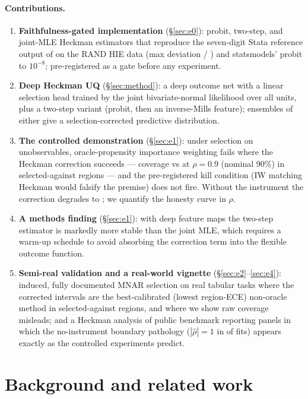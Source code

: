 \documentclass[10pt]{article}
\begin{document}
\paragraph{Contributions.}
\begin{enumerate}
\item \textbf{Faithfulness-gated implementation} (\S\ref{sec:e0}): probit,
two-step, and joint-MLE Heckman estimators that reproduce the seven-digit
Stata reference output of \citet{cameron2005} on the RAND HIE data
(max deviation \EZeroDevTS{} / \EZeroDevMLE{}) and statsmodels' probit to
$10^{-8}$; pre-registered as a gate before any experiment.
\item \textbf{Deep Heckman UQ} (\S\ref{sec:method}): a deep outcome net
with a linear selection head trained by the joint bivariate-normal
likelihood over all units, plus a two-step variant (probit, then an
inverse-Mills feature); ensembles of either give a selection-corrected
predictive distribution.
\item \textbf{The controlled demonstration} (\S\ref{sec:e1}): under
selection on unobservables, oracle-propensity importance weighting fails
where the Heckman correction succeeds --- coverage \CovAgIWHi{} vs
\CovAgHeckTSHi{} at $\rho = 0.9$ (nominal 90\%) in selected-against
regions --- and the pre-registered kill condition (IW matching Heckman
would falsify the premise) does not fire. Without the instrument the
correction degrades to \CovAgHeckTSHiNoInstr{}; we quantify the honesty
curve in $\rho$.
\item \textbf{A methods finding} (\S\ref{sec:e1}): with deep feature maps
the two-step estimator is markedly more stable than the joint MLE, which
requires a warm-up schedule to avoid absorbing the correction term into
the flexible outcome function.
\item \textbf{Semi-real validation and a real-world vignette}
(\S\ref{sec:e2}--\ref{sec:e4}): induced, fully documented MNAR selection
on real tabular tasks where the corrected intervals are the
best-calibrated (lowest region-ECE) non-oracle method in selected-against
regions, and where we show raw coverage misleads; and a Heckman analysis
of public benchmark reporting panels in which the no-instrument boundary
pathology ($|\hat\rho| = 1$ in \VigNBoundary{} of \VigNTotal{} fits)
appears exactly as the controlled experiments predict.
\end{enumerate}

\section{Background and related work}
\label{sec:related}
\end{document}
